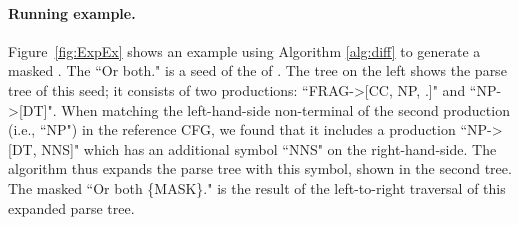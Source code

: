 \paragraph{Running example.} Figure~\ref{fig:ExpEx} shows an example using Algorithm \ref{alg:diff}
to generate a masked \sent. The \sent ``Or both." is a seed of the \lc of
\SareqExOne.  The tree on the left shows the parse tree of this seed;
it consists of two productions: ``FRAG->[CC, NP, .]" and ``NP->[DT]".
When matching the left-hand-side non-terminal of the second production
(i.e., ``NP") in the reference CFG, we found that it includes a
production ``NP->[DT, NNS]" which has an additional symbol ``NNS" on
the right-hand-side.  The algorithm thus expands the parse tree with
this symbol, shown in the second tree.  The masked \sent ``Or both
\{MASK\}." is the result of the left-to-right traversal of this
expanded parse tree.


